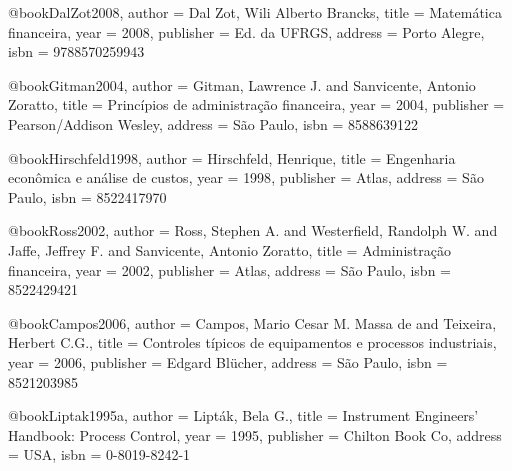 @book{DalZot2008,
  author = {Dal Zot, Wili Alberto Brancks},
  title = {Matemática financeira},
  year = {2008},
  publisher = {Ed. da UFRGS},
  address = {Porto Alegre},
  isbn = {9788570259943}
}

@book{Gitman2004,
  author = {Gitman, Lawrence J. and Sanvicente, Antonio Zoratto},
  title = {Princípios de administração financeira},
  year = {2004},
  publisher = {Pearson/Addison Wesley},
  address = {São Paulo},
  isbn = {8588639122}
}

@book{Hirschfeld1998,
  author = {Hirschfeld, Henrique},
  title = {Engenharia econômica e análise de custos},
  year = {1998},
  publisher = {Atlas},
  address = {São Paulo},
  isbn = {8522417970}
}

@book{Ross2002,
  author = {Ross, Stephen A. and Westerfield, Randolph W. and Jaffe, Jeffrey F. and Sanvicente, Antonio Zoratto},
  title = {Administração financeira},
  year = {2002},
  publisher = {Atlas},
  address = {São Paulo},
  isbn = {8522429421}
}

%

@book{Campos2006,
  author = {Campos, Mario Cesar M. Massa de and Teixeira, Herbert C.G.},
  title = {Controles típicos de equipamentos e processos industriais},
  year = {2006},
  publisher = {Edgard Blücher},
  address = {São Paulo},
  isbn = {8521203985}
}


@book{Liptak1995a,
  author = {Lipták, Bela G.},
  title = {Instrument Engineers' Handbook: Process Control},
  year = {1995},
  publisher = {Chilton Book Co},
  address = {USA},
  isbn = {0-8019-8242-1}
}

